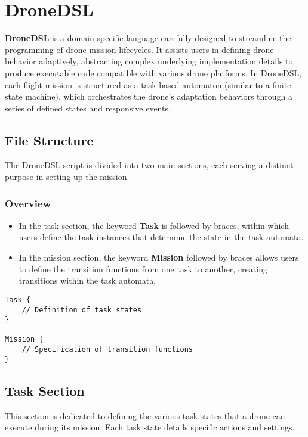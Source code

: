\chapter{DroneDSL}
\label{sec:dronedsl}


\textbf{DroneDSL} is a domain-specific language carefully designed to streamline the programming of drone mission lifecycles. It assists users in defining drone behavior adaptively, abstracting complex underlying implementation details to produce executable code compatible with various drone platforms. In DroneDSL, each flight mission is structured as a task-based automaton (similar to a finite state machine), which orchestrates the drone's adaptation behaviors through a series of defined states and responsive events.

\section{File Structure}
The DroneDSL script is divided into two main sections, each serving a distinct purpose in setting up the mission.

\subsection{Overview} 
\begin{itemize}
    \item In the task section, the keyword \textbf{Task} is followed by braces, within which users define the task instances that determine the state in the task automata.
    \item In the mission section, the keyword \textbf{Mission} followed by braces allows users to define the transition functions from one task to another, creating transitions within the task automata.
\end{itemize}

\begin{lstlisting}[style=customgo]
Task {
    // Definition of task states
}

Mission {
    // Specification of transition functions
}
\end{lstlisting}




\section{Task Section }
This section is dedicated to defining the various task states that a drone can execute during its mission. Each task state details specific actions and settings.

